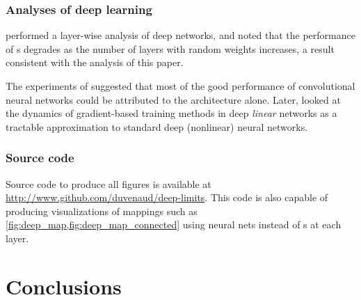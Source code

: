 \documentclass{article} %
\begin{document}
\subsubsection{Analyses of deep learning}
\citet{montavon2010layer} performed a layer-wise analysis of deep networks, and noted that the performance of \MLP{}s degrades as the number of layers with random weights increases, a result consistent with the analysis of this paper.

The experiments of \citet{saxe2011random} suggested that most of the good performance of convolutional neural networks could be attributed to the architecture alone.
Later, \citet{saxedynamics} looked at the dynamics of gradient-based training methods in deep \emph{linear} networks as a tractable approximation to standard deep (nonlinear) neural networks.  








\subsubsection{Source code}
Source code to produce all figures is available at \url{http://www.github.com/duvenaud/deep-limits}.
This code is also capable of producing visualizations of mappings such as \cref{fig:deep_map,fig:deep_map_connected} using neural nets instead of \gp{}s at each layer.


\section{Conclusions}

\end{document}
